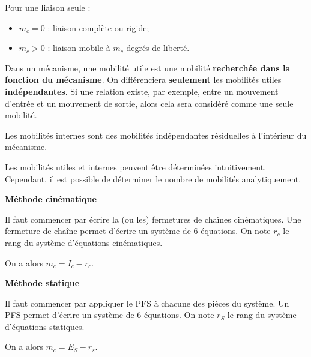 Pour une liaison seule :
\begin{itemize}
\item $m_c=0$ : liaison complète ou rigide;
\item $m_c>0$ : liaison mobile à $m_c$ degrés de liberté.
\end{itemize}

\begin{rem}
\item Dans un mécanisme, une mobilité utile est une mobilité \textbf{recherchée dans la fonction du mécanisme}.
On différenciera \textbf{seulement} les mobilités utiles \textbf{indépendantes}.
Si une relation existe, par exemple, entre un mouvement d'entrée et un mouvement de sortie, alors cela sera considéré comme une seule mobilité.
\item Les mobilités internes sont des mobilités indépendantes résiduelles à l'intérieur du mécanisme.
\end{rem}



\begin{methode}
Les mobilités utiles et internes peuvent être déterminées intuitivement. Cependant, il est possible de déterminer le nombre de mobilités analytiquement. 


\begin{multicols}{2}
\begin{center}
\textbf{Méthode cinématique}
\end{center}

\vspace{-.5cm}
Il faut commencer par écrire la (ou les) fermetures de chaînes cinématiques. Une fermeture de chaîne permet d'écrire un système de 6 équations. On note $r_c$ le rang du système d'équations cinématiques.

On a alors $m_c = I_c -r_c$.   

\begin{center}
\textbf{Méthode statique} 
\end{center}

\vspace{-.5cm}
Il faut commencer par appliquer le PFS à chacune des pièces du système. Un PFS permet d'écrire un système de 6 équations. On note $r_S$ le rang du système d'équations statiques.

On a alors $m_c =E_S - r_s$.   


\end{multicols}
\end{methode}
		
